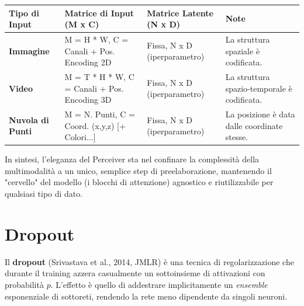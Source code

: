 \documentclass[
  11pt,
]{article}
\newcounter{none} %
\begin{document}
{\def\LTcaptype{none} %
\begin{longtable}{@{}
  >{\raggedright\arraybackslash}p{}
  >{\raggedright\arraybackslash}p{}
  >{\raggedright\arraybackslash}p{}
  >{\raggedright\arraybackslash}p{}@{}}
\toprule\noalign{}
\begin{minipage}[b]{\linewidth}\raggedright
Tipo di Input
\end{minipage} & \begin{minipage}[b]{\linewidth}\raggedright
Matrice di Input (M x C)
\end{minipage} & \begin{minipage}[b]{\linewidth}\raggedright
Matrice Latente (N x D)
\end{minipage} & \begin{minipage}[b]{\linewidth}\raggedright
Note
\end{minipage} \\
\midrule\noalign{}
\endhead
\bottomrule\noalign{}
\endlastfoot
\textbf{Immagine} & M = H * W, C = Canali + Pos. Encoding 2D & Fissa, N
x D (iperparametro) & La struttura spaziale è codificata. \\
\textbf{Video} & M = T * H * W, C = Canali + Pos. Encoding 3D & Fissa, N
x D (iperparametro) & La struttura spazio-temporale è codificata. \\
\textbf{Nuvola di Punti} & M = N. Punti, C = Coord. (x,y,z) {[}+
Colori...{]} & Fissa, N x D (iperparametro) & La posizione è data dalle
coordinate stesse. \\
\end{longtable}
}

In sintesi, l'eleganza del Perceiver sta nel confinare
la complessità della multimodalità a un unico, semplice step di
preelaborazione, mantenendo il "cervello" del modello (i blocchi di
attenzione) agnostico e riutilizzabile per qualsiasi tipo di dato.


\section{Dropout}
\label{app:dropout}

Il \textbf{dropout} (Srivastava et al., 2014, JMLR) è una tecnica di regolarizzazione che durante il training azzera casualmente un sottoinsieme di attivazioni con probabilità $p$. L'effetto è quello di addestrare implicitamente un \emph{ensemble} esponenziale di sottoreti, rendendo la rete meno dipendente da singoli neuroni.
\end{document}
